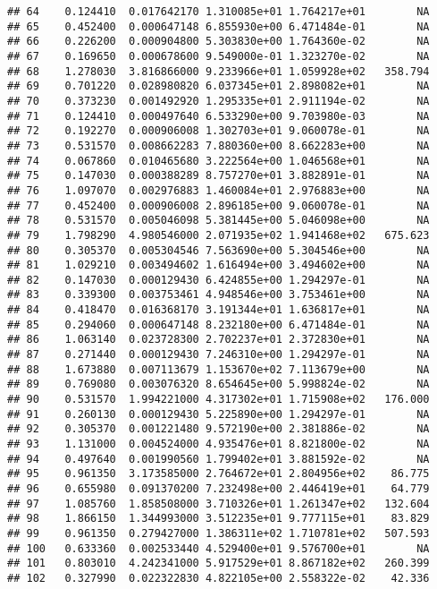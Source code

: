 \documentclass[
]{article}
\begin{document}
\begin{verbatim}
## 64    0.124410  0.017642170 1.310085e+01 1.764217e+01        NA
## 65    0.452400  0.000647148 6.855930e+00 6.471484e-01        NA
## 66    0.226200  0.000904800 5.303830e+00 1.764360e-02        NA
## 67    0.169650  0.000678600 9.549000e-01 1.323270e-02        NA
## 68    1.278030  3.816866000 9.233966e+01 1.059928e+02   358.794
## 69    0.701220  0.028980820 6.037345e+01 2.898082e+01        NA
## 70    0.373230  0.001492920 1.295335e+01 2.911194e-02        NA
## 71    0.124410  0.000497640 6.533290e+00 9.703980e-03        NA
## 72    0.192270  0.000906008 1.302703e+01 9.060078e-01        NA
## 73    0.531570  0.008662283 7.880360e+00 8.662283e+00        NA
## 74    0.067860  0.010465680 3.222564e+00 1.046568e+01        NA
## 75    0.147030  0.000388289 8.757270e+01 3.882891e-01        NA
## 76    1.097070  0.002976883 1.460084e+01 2.976883e+00        NA
## 77    0.452400  0.000906008 2.896185e+00 9.060078e-01        NA
## 78    0.531570  0.005046098 5.381445e+00 5.046098e+00        NA
## 79    1.798290  4.980546000 2.071935e+02 1.941468e+02   675.623
## 80    0.305370  0.005304546 7.563690e+00 5.304546e+00        NA
## 81    1.029210  0.003494602 1.616494e+00 3.494602e+00        NA
## 82    0.147030  0.000129430 6.424855e+00 1.294297e-01        NA
## 83    0.339300  0.003753461 4.948546e+00 3.753461e+00        NA
## 84    0.418470  0.016368170 3.191344e+01 1.636817e+01        NA
## 85    0.294060  0.000647148 8.232180e+00 6.471484e-01        NA
## 86    1.063140  0.023728300 2.702237e+01 2.372830e+01        NA
## 87    0.271440  0.000129430 7.246310e+00 1.294297e-01        NA
## 88    1.673880  0.007113679 1.153670e+02 7.113679e+00        NA
## 89    0.769080  0.003076320 8.654645e+00 5.998824e-02        NA
## 90    0.531570  1.994221000 4.317302e+01 1.715908e+02   176.000
## 91    0.260130  0.000129430 5.225890e+00 1.294297e-01        NA
## 92    0.305370  0.001221480 9.572190e+00 2.381886e-02        NA
## 93    1.131000  0.004524000 4.935476e+01 8.821800e-02        NA
## 94    0.497640  0.001990560 1.799402e+01 3.881592e-02        NA
## 95    0.961350  3.173585000 2.764672e+01 2.804956e+02    86.775
## 96    0.655980  0.091370200 7.232498e+00 2.446419e+01    64.779
## 97    1.085760  1.858508000 3.710326e+01 1.261347e+02   132.604
## 98    1.866150  1.344993000 3.512235e+01 9.777115e+01    83.829
## 99    0.961350  0.279427000 1.386311e+02 1.710781e+02   507.593
## 100   0.633360  0.002533440 4.529400e+01 9.576700e+01        NA
## 101   0.803010  4.242341000 5.917529e+01 8.867182e+02   260.399
## 102   0.327990  0.022322830 4.822105e+00 2.558322e-02    42.336

\end{verbatim}
\end{document}
